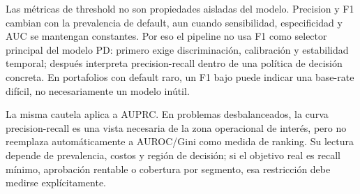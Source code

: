 \documentclass[
  spanish,
  11pt,
  letterpaper,
]{scrbook}
\theoremstyle{plain}
\theoremstyle{remark}
\begin{document}
\begin{tcolorbox}[enhanced jigsaw, arc=.35mm, bottomrule=.15mm, bottomtitle=1mm, breakable, colback=white, colbacktitle=quarto-callout-warning-color!10!white, colframe=quarto-callout-warning-color-frame, coltitle=black, left=2mm, leftrule=.75mm, opacityback=0, opacitybacktitle=0.6, rightrule=.15mm, title=\textcolor{quarto-callout-warning-color}{\faExclamationTriangle}\hspace{0.5em}{Precision, F1 y prevalencia}, titlerule=0mm, toprule=.15mm, toptitle=1mm]

Las métricas de threshold no son propiedades aisladas del modelo.
Precision y F1 cambian con la prevalencia de default, aun cuando
sensibilidad, especificidad y AUC se mantengan constantes. Por eso el
pipeline no usa F1 como selector principal del modelo PD: primero exige
discriminación, calibración y estabilidad temporal; después interpreta
precision-recall dentro de una política de decisión concreta. En
portafolios con default raro, un F1 bajo puede indicar una base-rate
difícil, no necesariamente un modelo inútil.

La misma cautela aplica a AUPRC. En problemas desbalanceados, la curva
precision-recall es una vista necesaria de la zona operacional de
interés, pero no reemplaza automáticamente a AUROC/Gini como medida de
ranking. Su lectura depende de prevalencia, costos y región de decisión;
si el objetivo real es recall mínimo, aprobación rentable o cobertura
por segmento, esa restricción debe medirse explícitamente.

\end{tcolorbox}
\end{document}
